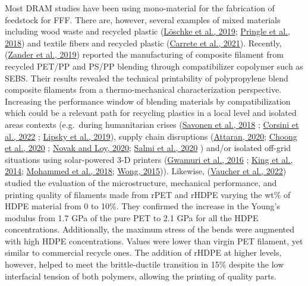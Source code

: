 \documentclass[
  12pt,
  number,
  review]{elsarticle}
\begin{document}
Most DRAM studies have been using mono-material for the fabrication of
feedstock for FFF. There are, however, several examples of mixed
materials including wood waste and recycled plastic
(\protect\hyperlink{ref-loschke2019}{Löschke et al., 2019};
\protect\hyperlink{ref-pringle2018}{Pringle et al., 2018}) and textile
fibers and recycled plastic (\protect\hyperlink{ref-carrete2021}{Carrete
et al., 2021}). Recently, (\protect\hyperlink{ref-Zander2019}{Zander et
al., 2019}) reported the manufacturing of composite filament from
recycled PET/PP and PS/PP blending through compatibilizer copolymer such
as SEBS. Their results revealed the technical printability of
polypropylene blend composite filaments from a thermo-mechanical
characterization perspective. Increasing the performance window of
blending materials by compatibilization which could be a relevant path
for recycling plastics in a local level and isolated areas contexts
(e.g.~during humanitarian crises
(\protect\hyperlink{ref-savonen2018}{Savonen et al., 2018} ;
\protect\hyperlink{ref-corsini2022}{Corsini et al., 2022} ;
\protect\hyperlink{ref-lipsky2019}{Lipsky et al., 2019}), supply chain
disruptions (\protect\hyperlink{ref-attaran2020}{Attaran, 2020};
\protect\hyperlink{ref-choong2020}{Choong et al., 2020} ;
\protect\hyperlink{ref-novak2020}{Novak and Loy, 2020};
\protect\hyperlink{ref-salmi2020}{Salmi et al., 2020} ) and/or isolated
off-grid situations using solar-powered 3-D printers
(\protect\hyperlink{ref-gwamuri2016}{Gwamuri et al., 2016} ;
\protect\hyperlink{ref-king2014}{King et al., 2014};
\protect\hyperlink{ref-Mohammed2018}{Mohammed et al., 2018};
\protect\hyperlink{ref-wong2015}{Wong, 2015})). Likewise,
(\protect\hyperlink{ref-vaucher2022}{Vaucher et al., 2022}) studied the
evaluation of the microstructure, mechanical performance, and printing
quality of filaments made from rPET and rHDPE varying the wt\% of HDPE
material from 0 to 10\%. They confirmed the increase in the Young's
modulus from 1.7 GPa of the pure PET to 2.1 GPa for all the HDPE
concentrations. Additionally, the maximum stress of the bends were
augmented with high HDPE concentrations. Values were lower than virgin
PET filament, yet similar to commercial recycle ones. The addition of
rHDPE at higher levels, however, helped to meet the brittle-ductile
transition in 15\% despite the low interfacial tension of both polymers,
allowing the printing of quality parts.
\end{document}
